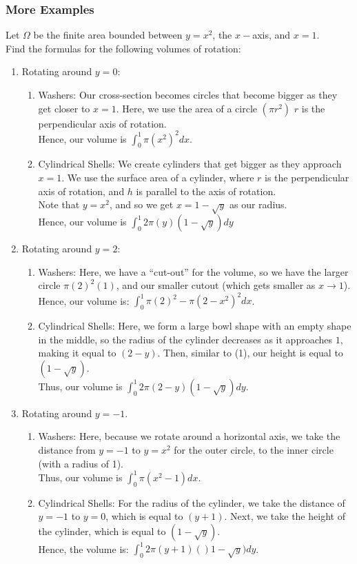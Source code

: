 \documentclass{article}
\begin{document}
\subsubsection{More Examples}
Let $\Omega$ be the finite area bounded between $y=x^2$, the $x-$axis, and $x=1$.\\
Find the formulas for the following volumes of rotation:
\begin{enumerate}
    \item Rotating around $y=0$:
    \begin{enumerate}
        \item Washers: Our cross-section becomes circles that become bigger as they get closer to $x=1$. Here, we use the area of a circle $(\pi r^2)$ $r$ is the perpendicular axis of rotation.\\
        Hence, our volume is $\int_0^1 \pi(x^2)^2 dx$.
        \item Cylindrical Shells: We create cylinders that get bigger as they approach $x=1$. We use the surface area of a cylinder, where $r$ is the perpendicular axis of rotation, and $h$ is parallel to the axis of rotation.\\
        Note that $y = x^2$, and so we get $x = 1 - \sqrt{y}$ as our radius.\\
        Hence, our volume is $\int_0^1 2\pi(y)(1-\sqrt{y}) dy$
    \end{enumerate}
    
    \item Rotating around $y=2$:
    \begin{enumerate}
        \item Washers: Here, we have a ``cut-out'' for the volume, so we have the larger circle $\pi(2)^2(1)$, and our smaller cutout (which gets smaller as $x \to 1$).\\
        Hence, our volume is: $\int_0^1 \pi(2)^2 - \pi(2-x^2)^2 dx$.
        \item Cylindrical Shells: Here, we form a large bowl shape with an empty shape in the middle, so the radius of the cylinder decreases as it approaches $1$, making it equal to $(2-y)$. Then, similar to (1), our height is equal to $(1- \sqrt{y})$.\\
        Thus, our volume is $\int_0^1 2\pi (2-y)(1-\sqrt{y})dy$.
    \end{enumerate}
    
    \item Rotating around $y=-1$.
    \begin{enumerate}
        \item Washers: Here, because we rotate around a horizontal axis, we take the distance from $y = -1$ to $y = x^2$ for the outer circle, to the inner circle (with a radius of 1).\\
        Thus, our volume is $\int_0^1 \pi(x^2 -1)dx$.
        \item Cylindrical Shells: For the radius of the cylinder, we take the distance of $y=-1$ to $y = 0$, which is equal to $(y+1)$. Next, we take the height of the cylinder, which is equal to $(1- \sqrt{y})$.\\
        Hence, the volume is: $\int_0^1 2\pi (y+1)()1 - \sqrt{y})dy$.
    \end{enumerate}
    

\end{enumerate}
\end{document}
